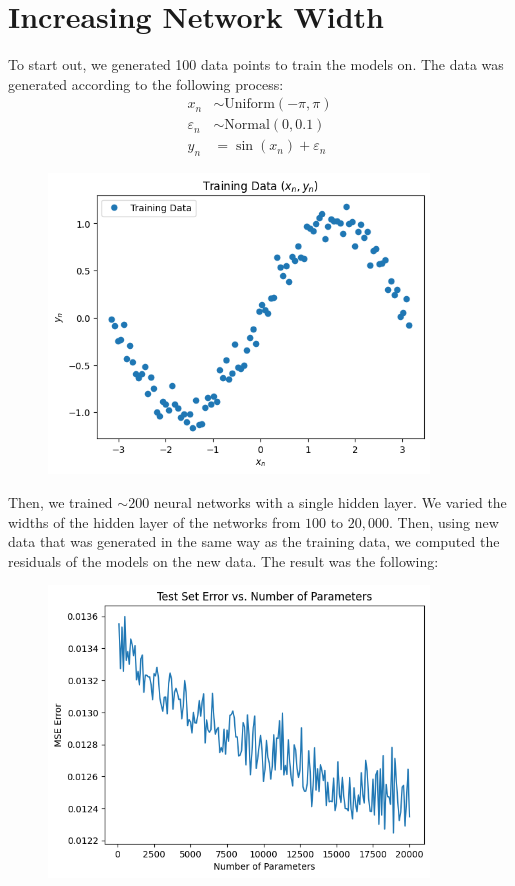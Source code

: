 \documentclass{article}
\begin{document}
\section{Increasing Network Width}
To start out, we generated 100 data points to train the models on.
The data was generated according to the following process:
\begin{align*}
    x_n &\sim \mathrm{Uniform}(-\pi, \pi) \\
    \varepsilon_n &\sim \mathrm{Normal}(0, 0.1) \\
    y_n &= \sin(x_n) + \varepsilon_n
\end{align*}
\begin{figure}[H]
    \centering
    \includegraphics[width=0.9\textwidth]{figures/trainingdata.png}
\end{figure}
Then, we trained $\sim 200$ neural networks with a single hidden layer.
We varied the widths of the hidden layer of the networks from $100$ to $20,000$.
Then, using new data that was generated in the same way as the training data, we computed the residuals of the models on the new data.
The result was the following:
\begin{figure}[H]
    \centering
    \includegraphics[width=0.9\textwidth]{figures/width.png}
\end{figure}
\end{document}
